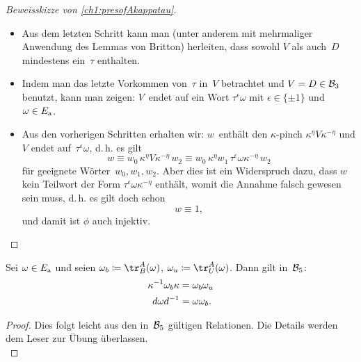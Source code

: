 \begin{proof}[Beweisskizze von \cref{ch1:presofAkappatau}]
\begin{itemize}
        \item
            Aus dem letzten Schritt kann man (unter anderem mit mehrmaliger
            Anwendung des Lemmas von Britton) herleiten, dass sowohl
            $V$ als auch~$D$ mindestens ein~$\tau$ enthalten.
            
        \item
            Indem man das letzte Vorkommen von~$\tau$ in~$V$ betrachtet
            und $V=D\in\mathcal{B}_3$ benutzt, kann man zeigen: $V$~endet auf
            ein Wort $\tau^\epsilon\omega$ mit $\epsilon\in\{\pm1\}$ und
            $\omega\in E_{\mathrm a}$.
            
        \item
            Aus den vorherigen Schritten erhalten wir:
            $w$~enthält den $\kappa$-pinch $\kappa^\eta V\!\kappa^{-\eta}$
            und $V$ endet auf~$\tau^\epsilon\omega$, d.\,h. es gilt
            \[ w \equiv w_0 \, \kappa^\eta V\!\kappa^{-\eta} \, w_2
                 \equiv w_0 \, \kappa^\eta w_1 \,
                 \tau^\epsilon\omega\kappa^{-\eta} \, w_2
            \]
            für geeignete Wörter~$w_0,w_1,w_2$.
            Aber dies ist ein Widerspruch dazu, dass $w$ kein Teilwort
            der Form $\tau^\epsilon\omega\kappa^{-\eta}$ enthält, womit
            die Annahme falsch gewesen sein muss, d.\,h. es gilt doch schon
            \[ w\equiv 1  , \]
            und damit ist $\phi$ auch injektiv.
            \\
            \qedhere
    \end{itemize}
\end{proof}

\begin{thLemma}\label{ch1:conjugatesinBT5}
    Sei $\omega\in E_{\mathrm a}$ und seien $\omega_b \defeq \tr^A_B(\omega)$,
    $\omega_u \defeq \tr^A_U(\omega)$. Dann gilt in~$\mathcal{B}_5$:
    \begin{align*}
        \kappa^{-1} \omega_b \kappa &= \omega_b\omega_u  \\
        d \omega d^{-1} &= \omega\omega_b
    . \end{align*}
\end{thLemma}
%
\begin{proof}
    Dies folgt leicht aus den in~$\mathcal{B}_5$ gültigen Relationen.
    Die Details werden dem Leser zur Übung überlassen.
    \\
\end{proof}

